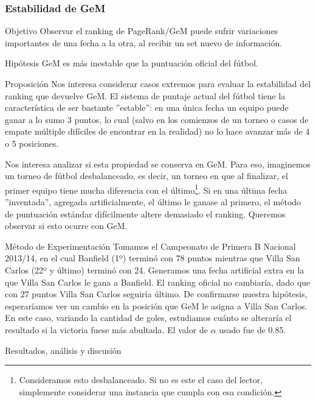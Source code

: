 \subsubsection{Estabilidad de GeM}
\label{subsec:exp7}
\begin{LaTeXdescription}
    \item[Objetivo] Observar el ranking de PageRank/GeM puede sufrir variaciones
        importantes de una fecha a la otra, al recibir un set nuevo de
        informaci\'on.\\

    \item[Hip\'otesis] GeM es m\'as inestable que la puntuaci\'on oficial del
        f\'utbol.\\

    \item[Proposici\'on] Nos interesa considerar casos extremos para evaluar la
        estabilidad del ranking que devuelve GeM. El sistema de puntaje actual
        del f\'utbol tiene la caracter\'istica de ser bastante ''estable'': en
        una \'unica fecha un equipo puede ganar a lo sumo 3 puntos, lo cual
        (salvo en los comienzos de un torneo o casos de empate m\'ultiple
        dif\'iciles de encontrar en la realidad) no lo hace avanzar m\'as de 4 o
        5 posiciones.

        \par Nos interesa analizar si esta propiedad se conserva en GeM. Para
        eso, imaginemos un torneo de f\'utbol desbalanceado, es decir, un torneo
        en que al finalizar, el primer equipo tiene mucha diferencia con el
        \'ultimo\footnote{Consideramos esto desbalanceado. Si no es este el
        caso del lector, simplemente considerar una instancia que cumpla con esa
        condici\'on.}. Si en una \'ultima fecha ''inventada'', agregada
        artificialmente, el \'ultimo le ganase al primero, el m\'etodo de
        puntuaci\'on est\'andar dif\'icilmente altere demasiado el ranking.
        Queremos observar si esto ocurre con GeM.\\

    \item[M\'etodo de Experimentaci\'on] Tomamos el Campeonato de Primera B
        Nacional 2013/14, en el cual Banfield (1º) termin\'o con 78 puntos
        mientras que Villa San Carlos (22º y \'ultimo) termin\'o con 24.
        Generamos una fecha artificial extra en la que Villa San Carlos le gana
        a Banfield. El ranking oficial no cambiar\'ia, dado que con 27
        puntos Villa San Carlos seguir\'ia \'ultimo. De confirmarse nuestra
        hip\'otesis, esperar\'iamos ver un cambio en la posición que GeM le
        asigna a Villa San Carlos. En este caso, variando la cantidad de goles,
        estudiamos cu\'anto se alterar\'ia el resultado si la victoria fuese
        m\'as abultada. El valor de $\alpha$ usado fue de 0.85.\\

    \item[Resultados, an\'alisis y discusi\'on]
\end{LaTeXdescription}

